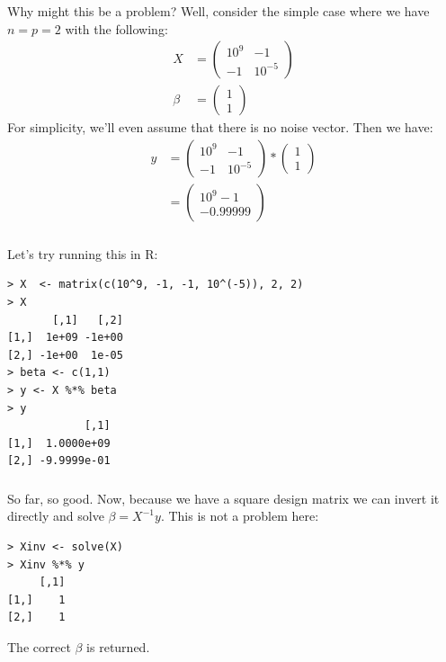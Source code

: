 \begin{frame}[fragile] \frametitle{}

Why might this be a problem? Well, consider the simple case where
we have $n = p = 2$ with the following:
\begin{align*}
X &= \left( \begin{array}{cc} 10^9 & -1 \\ -1 & 10^{-5} \end{array}\right) \\
\beta &= \left( \begin{array}{c} 1 \\ 1 \end{array}\right)
\end{align*}
\pause For simplicity, we'll even assume that there is no noise vector. Then
we have:
\begin{align*}
y &= \left( \begin{array}{cc} 10^9 & -1 \\ -1 & 10^{-5} \end{array}\right) * \left( \begin{array}{c} 1 \\ 1 \end{array}\right) \\
&= \left( \begin{array}{c} 10^9 - 1 \\ -0.99999 \end{array}\right)
\end{align*}

\end{frame}

\begin{frame}[fragile] \frametitle{}

Let's try running this in R:
\begin{verbatim}
> X  <- matrix(c(10^9, -1, -1, 10^(-5)), 2, 2)
> X
       [,1]   [,2]
[1,]  1e+09 -1e+00
[2,] -1e+00  1e-05
> beta <- c(1,1)
> y <- X %*% beta
> y
            [,1]
[1,]  1.0000e+09
[2,] -9.9999e-01
\end{verbatim}

\end{frame}

\begin{frame}[fragile] \frametitle{}

So far, so good. Now, because we have a square design matrix we
can invert it directly and solve $\beta = X^{-1} y$. This is not
a problem here:
\pause
\begin{verbatim}
> Xinv <- solve(X)
> Xinv %*% y
     [,1]
[1,]    1
[2,]    1
\end{verbatim}
\pause The correct $\beta$ is returned.

\end{frame}

